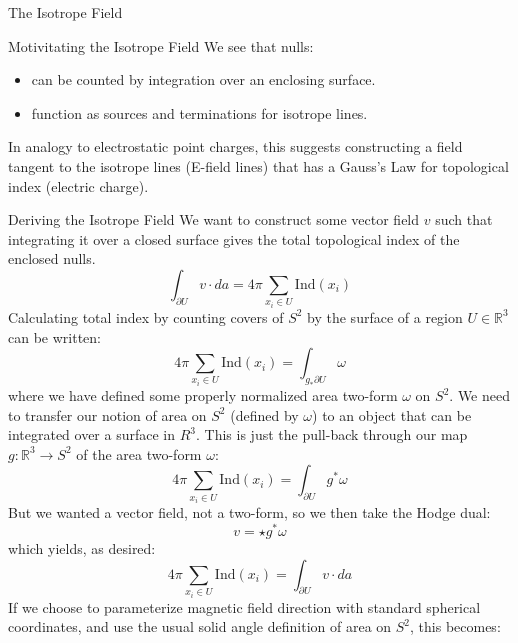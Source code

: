 \documentclass[final]{beamer}
\newlength{\onecolwid}
\begin{document}
\begin{frame}[t]
\begin{columns}[t]
\begin{column}{\onecolwid}
\begin{block}{\huge{The Isotrope Field}}
\begin{block}{Motivitating the Isotrope Field}
  We see that nulls:
  \begin{itemize}
  \item can be counted by integration over an enclosing surface.
  \item function as sources and terminations for isotrope lines.
  \end{itemize}
  In analogy to electrostatic point charges,
  this suggests constructing a field tangent to the isotrope lines (E-field lines)
  that has a Gauss's Law for topological index (electric charge).
\end{block}

\begin{block}{Deriving the Isotrope Field}
  We want to construct some vector field $v$ such that integrating it over a closed surface
  gives the total topological index of the enclosed nulls.
  \begin{equation}
    \int_{\partial U}v\cdot da=4\pi\sum_{x_i\in U}\mathrm{Ind}(x_i)
  \end{equation}
  Calculating total index by counting covers of $S^2$ by the surface of a region $U\in\mathbb{R}^3$
  can be written:
  \begin{equation}
    4\pi\sum_{x_i\in U}\mathrm{Ind}(x_i)=\int_{g_*\partial U}\omega
  \end{equation}
  where we have defined some properly normalized area two-form $\omega$ on $S^2$.
  We need to transfer our notion of area on $S^2$ (defined by $\omega$)
  to an object that can be integrated over a surface in $R^3$.
  This is just the pull-back through our map $g:\mathbb{R}^3\rightarrow S^2$
  of the area two-form $\omega$:
  \begin{equation}
    4\pi\sum_{x_i\in U}\mathrm{Ind}(x_i)=\int_{\partial U}g^*\omega
  \end{equation}
  But we wanted a vector field, not a two-form, so we then take the Hodge dual:
  \begin{equation}
    v=\star g^*\omega
  \end{equation}
  which yields, as desired:
  \begin{equation}
    4\pi\sum_{x_i\in U}\mathrm{Ind}(x_i)=\int_{\partial U}v\cdot da
  \end{equation}
  If we choose to parameterize magnetic field direction with standard spherical coordinates,
  and use the usual solid angle definition of area on $S^2$, this becomes:
  \begin{equation}

\end{equation}
\end{block}
\end{block}
\end{column}
\end{columns}
\end{frame}
\end{document}
